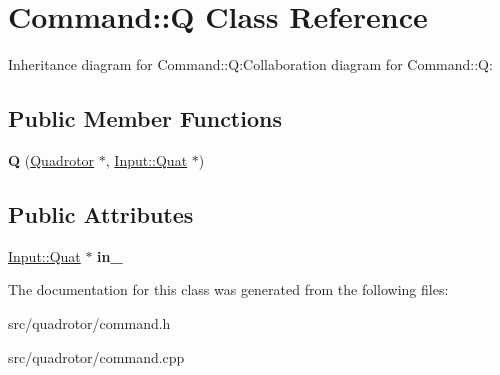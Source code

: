\hypertarget{classCommand_1_1Q}{
\section{Command::Q Class Reference}
\label{classCommand_1_1Q}
}
Inheritance diagram for Command::Q:Collaboration diagram for Command::Q:\subsection*{Public Member Functions}
\begin{DoxyCompactItemize}
\item 
\hypertarget{classCommand_1_1Q_a4eb218eafdd864d06a92afc16eb9fee9}{
{\bfseries Q} (\hyperlink{classQuadrotor}{Quadrotor} $\ast$, \hyperlink{classInput_1_1Quat}{Input::Quat} $\ast$)}
\label{classCommand_1_1Q_a4eb218eafdd864d06a92afc16eb9fee9}

\end{DoxyCompactItemize}
\subsection*{Public Attributes}
\begin{DoxyCompactItemize}
\item 
\hypertarget{classCommand_1_1Q_a01f5997c671688955fc024b845ab9689}{
\hyperlink{classInput_1_1Quat}{Input::Quat} $\ast$ {\bfseries in\_\-}}
\label{classCommand_1_1Q_a01f5997c671688955fc024b845ab9689}

\end{DoxyCompactItemize}


The documentation for this class was generated from the following files:\begin{DoxyCompactItemize}
\item 
src/quadrotor/command.h\item 
src/quadrotor/command.cpp\end{DoxyCompactItemize}
